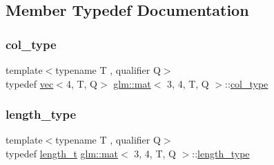 \subsection{Member Typedef Documentation}
\mbox{\label{structglm_1_1mat_3_013_00_014_00_01_t_00_01_q_01_4_aaa23c4674cbe2dc1eda1d826b8ef721e}} 
\subsubsection{\texorpdfstring{col\+\_\+type}{col\_type}}
{\footnotesize\ttfamily template$<$typename T , qualifier Q$>$ \\
typedef \mbox{\hyperlink{structglm_1_1vec}{vec}}$<$4, T, Q$>$ \mbox{\hyperlink{structglm_1_1mat}{glm\+::mat}}$<$ 3, 4, T, Q $>$\+::\mbox{\hyperlink{structglm_1_1mat_3_013_00_014_00_01_t_00_01_q_01_4_aaa23c4674cbe2dc1eda1d826b8ef721e}{col\+\_\+type}}}

\mbox{\label{structglm_1_1mat_3_013_00_014_00_01_t_00_01_q_01_4_a6a07c3870b8e6d4ba5f1ec8fa988d9bf}} 
\subsubsection{\texorpdfstring{length\+\_\+type}{length\_type}}
{\footnotesize\ttfamily template$<$typename T , qualifier Q$>$ \\
typedef \mbox{\hyperlink{namespaceglm_a090a0de2260835bee80e71a702492ed9}{length\+\_\+t}} \mbox{\hyperlink{structglm_1_1mat}{glm\+::mat}}$<$ 3, 4, T, Q $>$\+::\mbox{\hyperlink{structglm_1_1mat_3_013_00_014_00_01_t_00_01_q_01_4_a6a07c3870b8e6d4ba5f1ec8fa988d9bf}{length\+\_\+type}}}

\mbox{\label{structglm_1_1mat_3_013_00_014_00_01_t_00_01_q_01_4_a14121d7d6181d3e9eea914373f795c6c}} 
